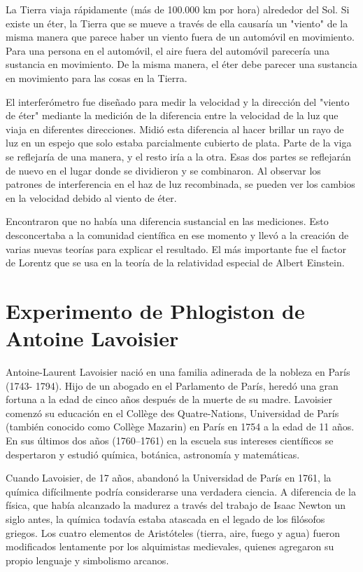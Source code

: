 \documentclass[letterpaper, 10pt, journal]{IEEEtran}
\begin{document}
La Tierra viaja rápidamente (más de 100.000 km por hora) alrededor del Sol. Si existe un éter, la Tierra que se mueve a través de ella causaría un "viento" de la misma manera que parece haber un viento fuera de un automóvil en movimiento. Para una persona en el automóvil, el aire fuera del automóvil parecería una sustancia en movimiento. De la misma manera, el éter debe parecer una sustancia en movimiento para las cosas en la Tierra.

El interferómetro fue diseñado para medir la velocidad y la dirección del "viento de éter" mediante la medición de la diferencia entre la velocidad de la luz que viaja en diferentes direcciones. Midió esta diferencia al hacer brillar un rayo de luz en un espejo que solo estaba parcialmente cubierto de plata. Parte de la viga se reflejaría de una manera, y el resto iría a la otra. Esas dos partes se reflejarán de nuevo en el lugar donde se dividieron y se combinaron. Al observar los patrones de interferencia en el haz de luz recombinada, se pueden ver los cambios en la velocidad debido al viento de éter.

Encontraron que no había una diferencia sustancial en las mediciones. Esto desconcertaba a la comunidad científica en ese momento y llevó a la creación de varias nuevas teorías para explicar el resultado. El más importante fue el factor de Lorentz que se usa en la teoría de la relatividad especial de Albert Einstein.

\section{Experimento de Phlogiston de Antoine Lavoisier}
Antoine-Laurent Lavoisier nació en una familia adinerada de la nobleza en París (1743- 1794). Hijo de un abogado en el Parlamento de París, heredó una gran fortuna a la edad de cinco años después de la muerte de su madre. Lavoisier comenzó su educación en el Collège des Quatre-Nations, Universidad de París (también conocido como Collège Mazarin) en París en 1754 a la edad de 11 años. En sus últimos dos años (1760–1761) en la escuela sus intereses científicos se despertaron y estudió química, botánica, astronomía y matemáticas.

Cuando Lavoisier, de 17 años, abandonó la Universidad de París en 1761, la química difícilmente podría considerarse una verdadera ciencia. A diferencia de la física, que había alcanzado la madurez a través del trabajo de Isaac Newton un siglo antes, la química todavía estaba atascada en el legado de los filósofos griegos. Los cuatro elementos de Aristóteles (tierra, aire, fuego y agua) fueron modificados lentamente por los alquimistas medievales, quienes agregaron su propio lenguaje y simbolismo arcanos.
\end{document}
